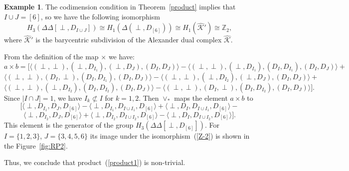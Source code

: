 \documentclass[a4paper,12pt]{amsart}
\newcommand{\DD}{\Delta\!\!\!\Delta}
\newcommand{\K}{\mathcal K}
\newcommand{\ZZ}{\mathbb Z}
\theoremstyle{definition}
\newtheorem{example}[formula]{Example}
\theoremstyle{remark}
\numberwithin{equation}{section}
\begin{document}
\begin{example}
    The codimension condition in Theorem~\ref{product} implies that $ I \cup J = [6]$,
    so we have the following isomorphism
    \begin{equation}\label{Z-2}
    H_3(\DD[\perp, D_{I \cup J}]) \cong H_1(\Delta(\perp, D_{[6]})) 
        \cong H_1(\widehat{\K}') \cong \ZZ_2,
    \end{equation}
    where $\widehat{\K}'$ is the barycentric subdivision  of the Alexander dual complex $\widehat{\K}$.
    
    From the definition of the map $\times$ we have:
	$$ a \times b = 
	[ 
		\langle (\perp, \perp), (\perp, D_{I_1}),  (\perp, D_J), (D_I, D_J) \rangle - 
		\langle (\perp, \perp), (\perp, D_{I_1}), (D_I, D_{I_1}), (D_I, D_J) \rangle +
	$$
	$$
		\langle (\perp, \perp), (D_I, \perp), (D_I, D_{I_1}), (D_I, D_J) \rangle -
		\langle (\perp, \perp), (\perp, D_{I_2}),  (\perp, D_J), (D_I, D_J) \rangle +
	$$
	$$
		\langle (\perp, \perp), (\perp, D_{I_2}), (D_I, D_{I_2}), (D_I, D_J) \rangle -
		\langle (\perp, \perp), (D_I, \perp), (D_I, D_{I_2}), (D_I, D_J) \rangle
	].
	$$
	Since $| I \cap J | = 1$, we have $I_k \not\subset I$ for $k = 1,2$.
	Then $\vee_*$ maps the element $a \times b$ to %
	$$[
		\langle \perp, D_{I_1}, D_J, D_{[6]} \rangle - \langle \perp, D_{I_1}, D_{I \cup I_1}, D_{[6]} \rangle +
		\langle \perp, D_I, D_{I \cup I_1}, D_{[6]} \rangle -
	$$
	$$
		\langle \perp, D_{I_2},  D_J, D_{[6]} \rangle +
		\langle \perp, D_{I_2}, D_{I \cup I_2}, D_{[6]} \rangle -
		\langle \perp, D_I, D_{I \cup I_2}, D_{[6]} \rangle ].
	$$
	This element is the generator of the group $H_3(\DD[\perp, D_{[6]}])$. For $I = \{1,2,3\}$, 
	$J = \{3,4,5,6\}$ its image under the isomorphism~(\ref{Z-2})
	is shown in the Figure~\ref{fig:RP2}.
    
    Thus, we conclude that product~(\ref{product1}) 
	is non-trivial.
\end{example}
\end{document}
